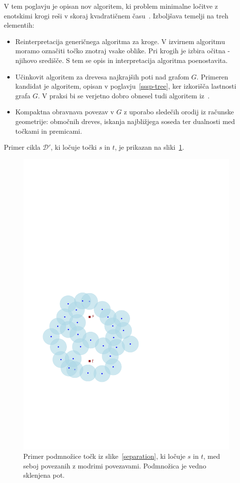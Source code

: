 \documentclass[a4paper, 12pt]{book}
\newcommand{\D}{\ensuremath{\mathcal{D}}}
\begin{document}
V tem poglavju je opisan nov algoritem, ki problem minimalne ločitve z enotskimi krogi reši v skoraj kvadratičnem času~\cite{CM2}. Izboljšava temelji na treh elementih:
\begin{itemize}
\item Reinterpretacija generičnega algoritma za kroge. V izvirnem algoritmu moramo označiti točko znotraj vsake oblike. Pri krogih je izbira očitna - njihovo središče. S tem se opis in interpretacija algoritma poenostavita.
\item Učinkovit algoritem za drevesa najkrajših poti nad grafom $G$. Primeren kandidat je algoritem, opisan v poglavju~\ref{sssp-tree}, ker izkorišča lastnosti grafa $G$. V praksi bi se verjetno dobro obnesel tudi algoritem iz~\cite{ChanS16}.
\item Kompaktna obravnava povezav v $G$ z uporabo sledečih orodij iz račun\-ske geometrije: območnih dreves, iskanja najbližjega soseda ter dualnosti med točkami in premicami. 
\end{itemize}

Primer cikla $\D'$, ki ločuje točki $s$ in $t$, je prikazan na sliki~\ref{walk}.

\begin{figure}[htp]
\centerline{\includegraphics[scale=0.6,page=3]{pics/separation.pdf}}
\caption{Primer podmnožice točk iz slike~\ref{separation}, ki ločuje $s$ in $t$, med seboj povezanih z modrimi povezavami. Podmnožica je vedno sklenjena pot.}
\label{walk}
\end{figure}
\end{document}

